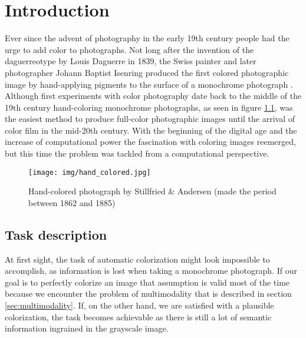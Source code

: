 \chapter{Introduction}

\begin{comment}
    The introduction to the thesis

    Colorization definition

    Topics to cover:
        What is image colorization
        Why is it useful
        What can it be used for
        Description of the task

        Not sure about previous work, if there is enough text, it might be its own chapter
\end{comment}

Ever since the advent of photography in the early 19th century people had
the urge to add color to photographs. Not long after the invention of the 
daguerreotype by Louis Daguerre in 1839, the Swiss painter and later photographer 
Johann Baptist Isenring produced the first colored photographic image by 
hand-applying pigments to the surface of a monochrome photograph \citep{henisch1996photograph}. 
Although first experiments with color photography date back to the middle of the 19th 
century hand-coloring monochrome photographs, as seen in figure \ref{fig:hand_colored}, 
was the easiest method to produce full-color photographic images until the arrival 
of color film in the mid-20th century. With the beginning of the digital age and 
the increase of computational power the fascination with coloring images reemerged, 
but this time the problem was tackled from a computational perspective.

\begin{figure}[H]
    \centering
    \texttt{[image: img/hand\_colored.jpg]}
    \caption{Hand-colored photograph by Stillfried \& Andersen (made the period between 1862 and 1885)}
    \label{fig:hand_colored}
\end{figure}

\section{Task description}

At first sight, the task of automatic colorization might look impossible to accomplish, 
as information is lost when taking a monochrome photograph. If our goal is to 
perfectly colorize an image that assumption is valid most of the time because we 
encounter the problem of multimodality that is described in section 
\ref{sec:multimodality}. If, on the other hand, we are satisfied with a plausible 
colorization, the task becomes achievable as there is still a lot of semantic 
information ingrained in the grayscale image. 

